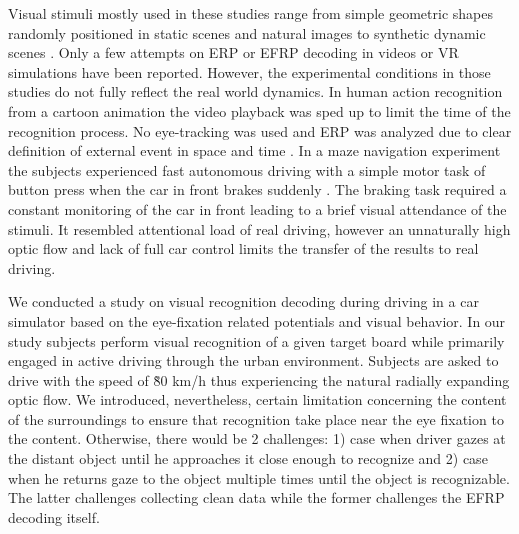 \documentclass[12pt]{iopart}
\begin{document}
Visual stimuli mostly used in these studies range from simple geometric shapes
randomly positioned in static scenes and natural images to synthetic dynamic
scenes \cite{uscumlic_active_2016,devillez_p300_2015}. 
Only a few attempts on ERP or EFRP decoding in videos or VR simulations
have been reported. 
However, the experimental conditions in those studies do not fully
reflect the real world dynamics.
In human action recognition from a cartoon animation the video playback was sped up
to limit the time of the recognition process. No eye-tracking was used
and ERP was analyzed due to clear 
definition of external event in space and time \cite{rosenthal_evoked_2014}.
In a maze navigation experiment the subjects experienced fast autonomous driving
with a simple motor task of button press when the car in front brakes suddenly \cite{jangraw_neurally_2014}.
The braking task required a constant monitoring of the car in front leading
to a brief visual attendance of the stimuli. It resembled attentional load
of real driving, however an unnaturally high optic flow and lack of full car control
limits the transfer of the results to real driving.


We conducted a study on visual recognition decoding during driving
in a car simulator based on the eye-fixation related
potentials and visual behavior. 
In our study subjects perform visual recognition of a given
target board while primarily engaged in active driving through
the urban environment. Subjects are asked to drive with the speed
of \~80 km/h thus experiencing the natural radially
expanding optic flow. 
We introduced, nevertheless, certain limitation concerning 
the content of the surroundings to ensure that recognition
take place near the eye fixation to the content. 
Otherwise, there would be 2 challenges: 
1) case when driver gazes at the distant object
until he approaches it close enough to recognize and
2) case when he returns gaze to the object multiple times until the object
is recognizable.
The latter challenges collecting clean data while the former challenges
the EFRP decoding itself.
\end{document}
